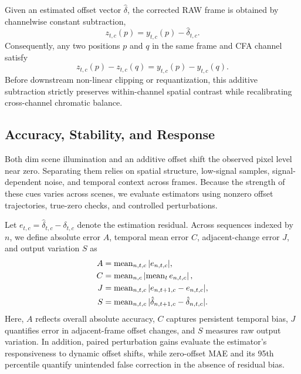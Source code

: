 Given an estimated offset vector $\hat\delta$, the corrected RAW frame is obtained by channelwise constant subtraction,
\begin{equation}
 z_{t,c}(p)=y_{t,c}(p)-\hat\delta_{t,c}.
 \label{eq:correction}
\end{equation}
Consequently, any two positions $p$ and $q$ in the same frame and CFA channel satisfy
\begin{equation}
 z_{t,c}(p)-z_{t,c}(q)=y_{t,c}(p)-y_{t,c}(q).
 \label{eq:invariance}
\end{equation}
Before downstream non-linear clipping or requantization, this additive subtraction strictly preserves within-channel spatial contrast while recalibrating cross-channel chromatic balance.

\subsection{Accuracy, Stability, and Response}
Both dim scene illumination and an additive offset shift the observed pixel level near zero. Separating them relies on spatial structure, low-signal samples, signal-dependent noise, and temporal context across frames. Because the strength of these cues varies across scenes, we evaluate estimators using nonzero offset trajectories, true-zero checks, and controlled perturbations.

Let $e_{t,c}=\hat\delta_{t,c}-\delta_{t,c}$ denote the estimation residual. Across sequences indexed by $n$, we define absolute error $A$, temporal mean error $C$, adjacent-change error $J$, and output variation $S$ as
\begin{align}
 A&=\operatorname{mean}_{n,t,c}|e_{n,t,c}|,\label{eq:A}\\
 C&=\operatorname{mean}_{n,c}\left|\operatorname{mean}_t e_{n,t,c}\right|,\label{eq:C}\\
 J&=\operatorname{mean}_{n,t,c}|e_{n,t+1,c}-e_{n,t,c}|,\label{eq:J}\\
 S&=\operatorname{mean}_{n,t,c}|\hat\delta_{n,t+1,c}-\hat\delta_{n,t,c}|.\label{eq:S}
\end{align}
Here, $A$ reflects overall absolute accuracy, $C$ captures persistent temporal bias, $J$ quantifies error in adjacent-frame offset changes, and $S$ measures raw output variation. In addition, paired perturbation gains evaluate the estimator's responsiveness to dynamic offset shifts, while zero-offset MAE and its 95th percentile quantify unintended false correction in the absence of residual bias.


